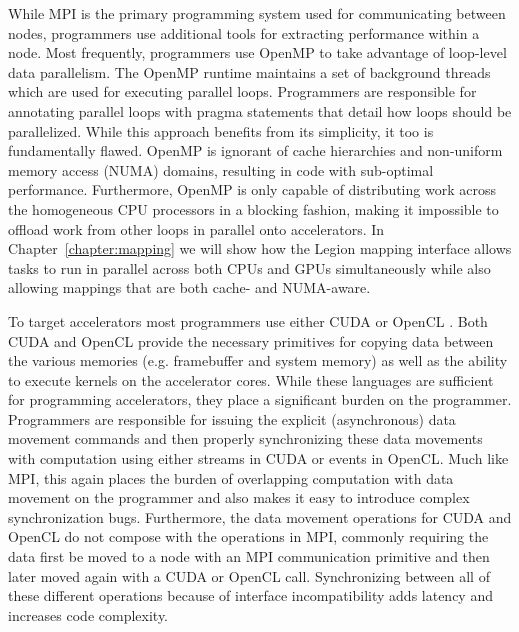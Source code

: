 While MPI is the primary programming system used
for communicating between nodes, programmers
use additional tools for extracting performance
within a node. Most frequently, programmers use 
OpenMP \cite{OPENMP98} to take advantage of loop-level
data parallelism. The OpenMP runtime maintains
a set of background threads which are used for
executing parallel loops. Programmers are responsible
for annotating parallel loops with pragma statements
that detail how loops should be parallelized. While
this approach benefits from its simplicity, it too
is fundamentally flawed. OpenMP is ignorant of cache
hierarchies and non-uniform memory access (NUMA)
domains, resulting in code with sub-optimal 
performance. Furthermore, OpenMP is only capable of 
distributing work across the homogeneous CPU processors 
in a blocking fashion, making it impossible to offload 
work from other loops in parallel onto accelerators. In 
Chapter~\ref{chapter:mapping} we will show how the 
Legion mapping interface allows tasks to run in 
parallel across both CPUs and GPUs simultaneously 
while also allowing mappings that are both cache- and NUMA-aware.

To target accelerators most programmers use either
CUDA \cite{CUDA} or OpenCL \cite{Khronos:OpenCL}. Both 
CUDA and OpenCL provide the necessary primitives for
copying data between the various memories (e.g.
framebuffer and system memory) as well as the
ability to execute kernels on the accelerator
cores. While these languages are sufficient for programming
accelerators, they place a significant burden
on the programmer. Programmers are responsible
for issuing the explicit (asynchronous)
data movement commands and then properly
synchronizing these data movements with 
computation using either streams in CUDA or
events in OpenCL. Much like MPI, this again
places the burden of overlapping computation
with data movement on the programmer and 
also makes it easy to introduce complex
synchronization bugs. Furthermore, the
data movement operations for CUDA and OpenCL
do not compose with the operations in MPI,
commonly requiring the data first be moved
to a node with an MPI communication primitive 
and then later moved again with a CUDA or
OpenCL call. Synchronizing between all of 
these different operations because of interface
incompatibility adds latency and increases 
code complexity. 

